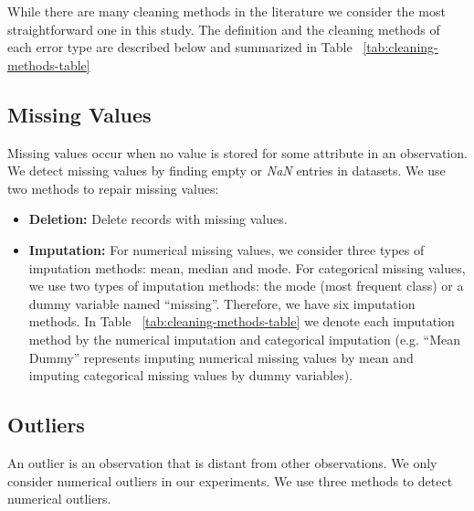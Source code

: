 While there are many cleaning methods in the literature we consider the most straightforward
one in this study. 
The definition and the cleaning methods of each
error type are described below and summarized in Table ~\ref{tab:cleaning-methods-table}

\subsection{Missing Values}
Missing values occur when no value is stored for some attribute
in an observation. We detect missing values by finding empty or
\textit{NaN} entries in datasets. We use two methods to repair missing
values:
\begin{itemize}
	\item{\textbf{Deletion:} Delete records with missing values.
	}
	\item{
		\textbf{Imputation:} For numerical missing values, we consider three
		types of imputation methods: mean, median and mode. For categorical missing values, we use two types of imputation methods: the mode (most frequent class) or a dummy variable named
		“missing”. Therefore, we have six imputation methods. In Table ~\ref{tab:cleaning-methods-table} we denote each imputation method by the numerical imputation and categorical imputation (e.g. “Mean Dummy” represents
		imputing numerical missing values by mean and imputing categorical missing values by dummy variables).
	}
\end{itemize}

\subsection{Outliers}
An outlier is an observation that is distant from other observations. We only consider numerical outliers in our experiments. We use three methods to detect numerical outliers.

